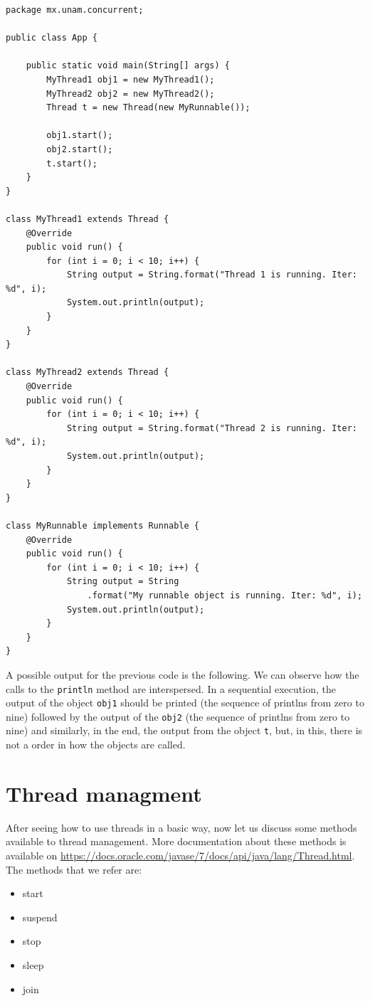 \documentclass[openany, a4paper]{book}
\theoremstyle{break}
\theoremstyle{example}
\theoremstyle{note}
\theoremstyle{break}
\theoremstyle{exercise}
\begin{document}
\begin{verbatim}
package mx.unam.concurrent;

public class App {

    public static void main(String[] args) {
        MyThread1 obj1 = new MyThread1();
        MyThread2 obj2 = new MyThread2();
        Thread t = new Thread(new MyRunnable());

        obj1.start();
        obj2.start();
        t.start();
    }
}

class MyThread1 extends Thread {
    @Override
    public void run() {
        for (int i = 0; i < 10; i++) {
            String output = String.format("Thread 1 is running. Iter: %d", i);
            System.out.println(output);
        }
    }
}

class MyThread2 extends Thread {
    @Override
    public void run() {
        for (int i = 0; i < 10; i++) {
            String output = String.format("Thread 2 is running. Iter: %d", i);
            System.out.println(output);
        }
    }
}

class MyRunnable implements Runnable {
    @Override
    public void run() {
        for (int i = 0; i < 10; i++) {
            String output = String
                .format("My runnable object is running. Iter: %d", i);
            System.out.println(output);
        }
    }
}
\end{verbatim}

A possible output for the previous code is the following. We can observe how
the calls to the \texttt{println} method are interspersed. In a sequential execution,
the output of the object \texttt{obj1} should be printed (the sequence of printlns
from zero to nine) followed by the output of the \texttt{obj2} (the sequence of
printlns from zero to nine) and similarly, in the end, the output from the
object \texttt{t}, but, in this, there is not a order in how the objects are
called.

\section{Thread managment}
\label{sec:orgbc146e9}

After seeing how to use threads in a basic way, now let us discuss some
methods available to thread management. More documentation about these
methods is available on
\url{https://docs.oracle.com/javase/7/docs/api/java/lang/Thread.html}.
The methods that we refer are:

\begin{itemize}
\item start
\item suspend
\item stop
\item sleep
\item join
\end{itemize}
\end{document}
